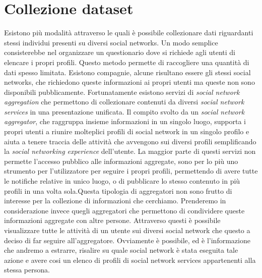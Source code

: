 \chapter{Collezione dataset}
\label{cap3}

Esistono più modalità attraverso le quali è possibile collezionare dati riguardanti stessi individui presenti su diversi social networks. Un modo semplice consisterebbe nel organizzare un questionario dove si richiede agli utenti di elencare i propri profili. Questo metodo permette di raccogliere una quantità di dati spesso limitata. Esistono compagnie, alcune risultano essere gli stessi social networks, che richiedono queste informazioni ai propri utenti ma queste non sono disponibili pubblicamente.
Fortunatamente esistono servizi di \textit{social network aggregation} che permettono di collezionare contenuti da diversi \textit{social network services} in una presentazione unificata. Il compito svolto da un \textit{social network aggregator}, che raggruppa insieme informazioni in un singolo luogo, supporta i propri utenti a riunire molteplici profili di social network in un singolo profilo e aiuta a tenere traccia delle attività che avvengono sui diversi profili semplificando la \textit{social networking experience} dell'utente.
La maggior parte di questi servizi non permette l'accesso pubblico alle informazioni aggregate, sono per lo più uno strumento per l'utilizzatore per seguire i propri profili, permettendo di avere tutte le notifiche relative in unico luogo, o di pubblicare lo stesso contenuto in più profili in una volta sola.Questa tipologia di aggregatori non sono frutto di interesse per la collezione di informazioni che cerchiamo.
Prenderemo in considerazione invece quegli aggregatori che permettono di condividere queste informazioni aggregate con altre persone. Attraverso questi è possibile visualizzare tutte le attività di un utente sui diversi social network che questo a deciso di far seguire all'aggregatore. Ovviamente è possibile, ed è l'informazione che andremo a estrarre, risalire su quale social network è stata eseguita tale azione e avere cosi un elenco di profili di social network services appartenenti alla stessa persona.
